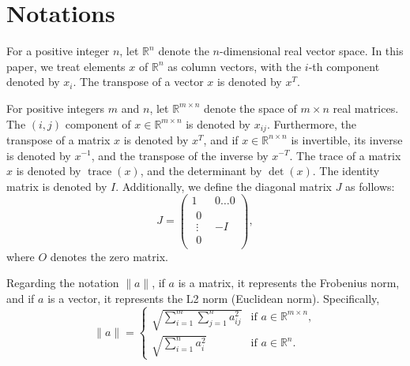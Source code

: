 \section{Notations}\label{sec:notation}


For a positive integer $n$, let $\mathbb{R}^n$ denote the $n$-dimensional real vector space. In this paper, we treat elements $x$ of $\mathbb{R}^n$ as column vectors, with the $i$-th component denoted by $x_i$. The transpose of a vector $x$ is denoted by $x^T$.

For positive integers $m$ and $n$, let $\mathbb{R}^{m \times n}$ denote the space of $m \times n$ real matrices. The $(i,j)$ component of $x \in \mathbb{R}^{m \times n}$ is denoted by $x_{ij}$. Furthermore, the transpose of a matrix $x$ is denoted by $x^T$, and if $x \in \mathbb{R}^{n \times n}$ is invertible, its inverse is denoted by $x^{-1}$, and the transpose of the inverse by $x^{-T}$. The trace of a matrix $x$ is denoted by $\operatorname{trace}(x)$, and the determinant by $\operatorname{det}(x)$. The identity matrix is denoted by $I$. Additionally, we define the diagonal matrix $J$ as follows:
\[
    J = \begin{pmatrix}
         1 & 0 \ldots 0\\
         \substack{\displaystyle 0\\\displaystyle\vdots\\\displaystyle 0} & -I 
    \end{pmatrix},
\]
where $O$ denotes the zero matrix.

Regarding the notation $\|a\|$, if $a$ is a matrix, it represents the Frobenius norm, and if $a$ is a vector, it represents the L2 norm (Euclidean norm). Specifically,
\[
\|a\| = 
\begin{cases}
    \sqrt{\sum_{i=1}^m \sum_{j=1}^n a_{ij}^2} & \text{if } a \in \mathbb{R}^{m \times n},\\
    \sqrt{\sum_{i=1}^n a_i^2} & \text{if } a \in \mathbb{R}^n.
\end{cases}
\]

